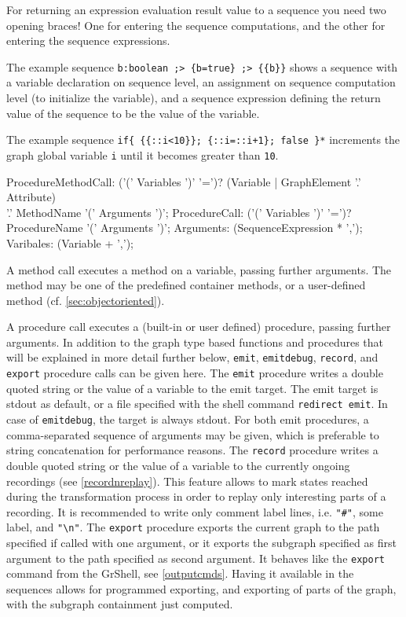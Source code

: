 \begin{note}
For returning an expression evaluation result value to a sequence you need two opening braces! 
One for entering the sequence computations, and the other for entering the sequence expressions.
\end{note}

\begin{example}
The example sequence
\verb#b:boolean ;> {b=true} ;> {{b}}#
shows a sequence with a variable declaration on sequence level, an assignment on sequence computation level (to initialize the variable), and a sequence expression defining the return value of the sequence to be the value of the variable.

The example sequence
\verb#if{ {{::i<10}}; {::i=::i+1}; false }*#
increments the graph global variable \texttt{i} until it becomes greater than \texttt{10}.
\end{example}

\begin{rail} 
	ProcedureMethodCall: ('(' Variables ')' '=')? (Variable | GraphElement '.' Attribute) \\ '.' MethodName '(' Arguments ')';
	ProcedureCall: ('(' Variables ')' '=')? ProcedureName '(' Arguments ')';
	Arguments: (SequenceExpression * ',');
	Varibales: (Variable + ',');
\end{rail}\label{recstmt}

A method call executes a method on a variable, passing further arguments.
The method may be one of the predefined container methods, or a user-defined method (cf. \ref{sec:objectoriented}).

A procedure call executes a (built-in or user defined) procedure, passing further arguments.
In addition to the graph type based functions and procedures that will be explained in more detail further below,
\texttt{emit}, \texttt{emitdebug}, \texttt{record}, and \texttt{export} procedure calls can be given here. 
The \texttt{emit} procedure writes a double quoted string or the value of a variable to the emit target.
The emit target is stdout as default, or a file specified with the shell command \texttt{redirect emit}. 
In case of \texttt{emitdebug}, the target is always stdout.
For both emit procedures, a comma-separated sequence of arguments may be given, which is preferable to string concatenation for performance reasons.
The \texttt{record} procedure writes a double quoted string or the value of a variable to the currently ongoing recordings (see \ref{recordnreplay}). 
This feature allows to mark states reached during the transformation process in order to replay only interesting parts of a recording.
It is recommended to write only comment label lines, i.e. \verb/"#"/, some label, and \verb/"\n"/.
The \texttt{export} procedure exports the current graph to the path specified if called with one argument, or it exports the subgraph specified as first argument to the path specified as second argument.
It behaves like the \texttt{export} command from the GrShell, see \ref{outputcmds}.
Having it available in the sequences allows for programmed exporting, and exporting of parts of the graph, with the subgraph containment just computed.

